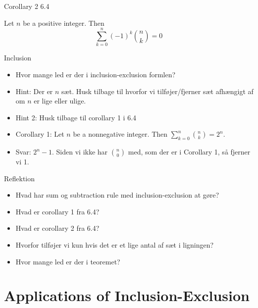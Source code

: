 \documentclass{beamer}
\begin{document}
\begin{frame}{Corollary 2 6.4}
    \begin{corollary}
    Let $n$ be a positive integer. Then
        $$\sum^n_{k=0} (-1)^k \binom{n}{k} = 0$$ 
    \end{corollary}
\end{frame}

\begin{frame}{Inclusion}
  \begin{itemize}
      \item<1-> Hvor mange led er der i inclusion-exclusion formlen? 
      \item<1-> Hint: Der er $n$ sæt. Husk tilbage til hvorfor vi tilføjer/fjerner sæt afhængigt af om $n$ er lige eller ulige. 
      \item<2-> Hint 2: Husk tilbage til corollary 1 i 6.4
      \item<3-> Corollary 1: Let $n$ be a nonnegative integer. Then $\sum^n_{k=0}\binom{n}{k} = 2^n$.
      \item<4-> Svar: $2^n - 1$. Siden vi ikke har $\binom{n}{0}$ med, som der er i Corollary 1, så fjerner vi 1.
  \end{itemize}  
\end{frame}

\begin{frame}{Reflektion}
   \begin{itemize}
       \item Hvad har sum og subtraction rule med inclusion-exclusion at gøre? 
       \item Hvad er corollary 1 fra 6.4?
       \item Hvad er corollary 2 fra 6.4? 
       \item Hvorfor tilføjer vi kun hvis det er et lige antal af sæt i ligningen? 
       \item Hvor mange led er der i teoremet? 
   \end{itemize} 
\end{frame}

\section{Applications of Inclusion-Exclusion}
\end{document}
